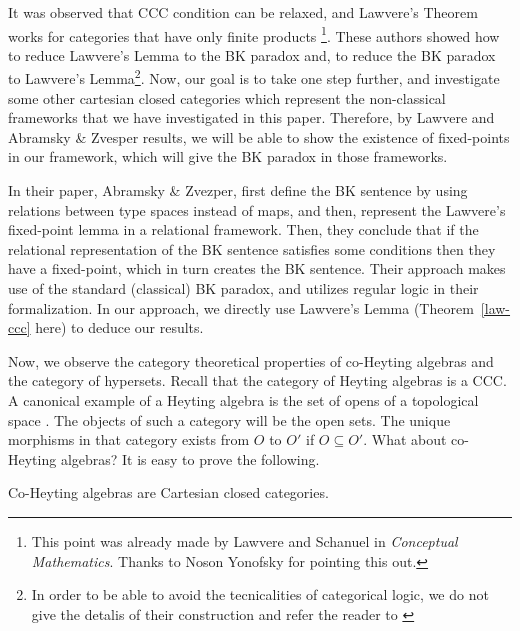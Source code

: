 \documentclass{article}
\begin{document}
It was observed that CCC condition can be relaxed, and Lawvere's Theorem works for categories that have only finite products \cite{abr0}\footnote{This point was already made by Lawvere and Schanuel in \emph{Conceptual Mathematics}. Thanks to Noson Yonofsky for pointing this out.}. These authors showed how to reduce Lawvere's Lemma to the BK paradox and, to reduce the BK paradox to Lawvere's Lemma\footnote{In order to be able to avoid the tecnicalities of categorical logic, we do not give the detalis of their construction and refer the reader to \cite{abr0}}. Now, our goal is to take one step further, and investigate some other cartesian closed categories which represent the non-classical frameworks that we have investigated in this paper. Therefore, by Lawvere and Abramsky \& Zvesper results, we will be able to show the existence of fixed-points in our framework, which will give the BK paradox in those frameworks. 

In their paper, Abramsky \& Zvezper, first define the BK sentence by using relations between type spaces instead of maps, and then, represent the Lawvere's fixed-point lemma in a relational framework. Then, they conclude that if the relational representation of the BK sentence satisfies some conditions then they have a fixed-point, which in turn creates the BK sentence. Their approach makes use of the standard (classical) BK paradox, and utilizes regular logic in their formalization. In our approach, we directly use Lawvere's Lemma (Theorem~\ref{law-ccc} here) to deduce our results.

Now, we observe the category theoretical properties of co-Heyting algebras and the category of hypersets. Recall that the category of Heyting algebras is a CCC. A canonical example of a Heyting algebra is the set of opens of a topological space \cite{awo0}. The objects of such a category will be the open sets. The unique morphisms in that category exists from $O$ to $O'$ if $O \subseteq O'$. What about co-Heyting algebras? It is easy to prove the following.

\begin{prop} Co-Heyting algebras are Cartesian closed categories.\end{prop}
\end{document}
